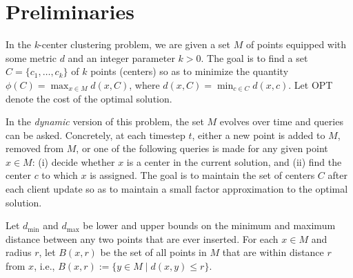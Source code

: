 \section{Preliminaries}
In the \textit{k}-center clustering problem, we are given a set $\mathit{M}$ of points equipped with some metric $d$ and an integer parameter $k > 0$. The goal is to find a set $C = \{ c_1, \dots, c_k \}$ of $k$ points (centers) so as to minimize the quantity $\phi(C) = \max_{x \in M} d(x, C)$, where $d(x, C) = \min_{c \in C} d(x, c)$. Let OPT denote the cost of the optimal solution.

In the \textit{dynamic} version of this problem, the set $M$ evolves over time and queries can be asked. Concretely, at each timestep $t$, either a new point is added to $M$, removed from $M$, or one of the following queries is made for any given point $x \in M$: 
(i) decide whether $x$ is a center in the current solution, and 
(ii) find the center $c$ to which $x$ is assigned. The goal is to maintain the set of centers $C$ after each client update so as to maintain a small factor approximation to the optimal solution.

Let $d_{\text{min}}$ and $d_{\text{max}}$ be lower and upper bounds on the minimum and maximum distance between any two points that are ever inserted. For each $x \in M$ and radius $r$, let $B(x, r)$ be the set of all points in $M$ that are within distance $r$ from $x$, i.e., $B(x, r) := \{ y \in M \mid d(x, y) \leq r \}$.